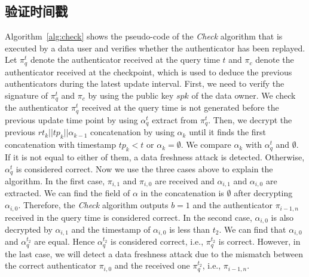 \subsection{验证时间戳}
Algorithm~\ref{alg:check} shows the pseudo-code of the {\it Check} algorithm that is executed by a data user and verifies whether the authenticator has been replayed. Let $\pi^t_q$ denote the authenticator received at the query time $t$ and $\pi_c$ denote the authenticator received at the checkpoint, which is used to deduce the previous authenticators during the latest update interval. First, we need to verify the signature of $\pi^t_q$ and $\pi_c$ by using the public key $spk$ of the data owner. We check the authenticator $\pi^t_q$ received at the query time is not generated before the previous update time point by using $\alpha^t_q$ extract from $\pi^t_q$. Then, we decrypt the previous $rt_k||tp_k||\alpha_{k-1}$ concatenation by using $\alpha_k$ until it finds the first concatenation with timestamp $tp_k < t$ or $\alpha_k = \emptyset$. We compare $\alpha_k$ with $\alpha^t_q$ and $\emptyset$. If it is not equal to either of them, a data freshness attack is detected. Otherwise, $\alpha^t_q$ is considered correct. Now we use the three cases above to explain the algorithm. In the first case, $\pi_{i, 1}$ and $\pi_{i, 0}$ are received and $\alpha_{i,1}$ and $\alpha_{i,0}$ are extracted. We can find the field of $\alpha$ in the concatenation is $\emptyset$ after decrypting $\alpha_{i, 0}$. Therefore, the {\it Check} algorithm outputs $b=1$ and the authenticator $\pi_{i-1, n}$ received in the query time is considered correct. In the second case, $\alpha_{i, 0}$ is also decrypted by $\alpha_{i, 1}$ and the timestamp of $\alpha_{i, 0}$ is less than $t_2$. We can find that $\alpha_{i, 0}$ and $\alpha^{t_2}_q$ are equal. Hence $\alpha^{t_2}_q$ is considered correct, i.e., $\pi^{t_2}_q$ is correct. However, in the last case, we will detect a data freshness attack due to the mismatch between the correct authenticator $\pi_{i, 0}$ and the received one $\pi^{t_2}_q$, i.e., $\pi_{i-1, n}$.

